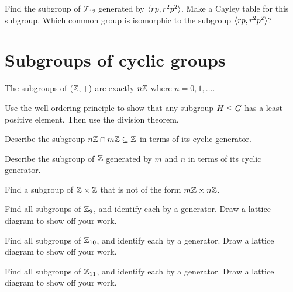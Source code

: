 \documentclass{ximera}
\begin{document}
\begin{exercise}
  Find the subgroup of $\mathcal{T}_{12}$ generated by $\langle rp,
  r^2p^2\rangle$. Make a Cayley table for this subgroup. Which common
  group is isomorphic to the subgroup $\langle rp, r^2p^2\rangle$?
\end{exercise}





\section{Subgroups of cyclic groups}

\begin{theorem}
  The subgroups of $(\mathbb Z,+)$ are exactly $n\mathbb Z$ where $n = 0,1,\dots$.
  \begin{sketch}
    Use the well ordering principle to show that any subgroup $H\leq
    G$ has a least positive element. Then use the division theorem.
  \end{sketch}
\end{theorem}

\begin{exercise}
  Describe the subgroup $n\mathbb Z\cap m\mathbb Z \subseteq \mathbb Z$ in terms of its
  cyclic generator.
\end{exercise}


\begin{exercise}
  Describe the subgroup of $\mathbb Z$ generated by $m$ and $n$ in terms of
  its cyclic generator.
\end{exercise}

\begin{exercise}
  Find a subgroup of $\mathbb Z\times\mathbb Z$ that is not of the form $m\mathbb Z \times
  n\mathbb Z$.
\end{exercise}


\begin{exercise}
  Find all subgroups of $\mathbb Z_9$, and identify each by a generator. Draw
  a lattice diagram to show off your work.
\end{exercise}


\begin{exercise}
  Find all subgroups of $\mathbb Z_{10}$, and identify each by a generator. Draw
  a lattice diagram to show off your work.
\end{exercise}

\begin{exercise}
  Find all subgroups of $\mathbb Z_{11}$, and identify each by a generator. Draw
  a lattice diagram to show off your work.
\end{exercise}
\end{document}
